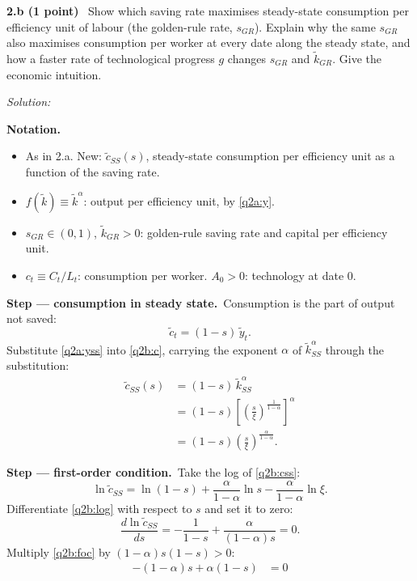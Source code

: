 \documentclass[11pt,a4paper]{article}
\newif\ifsolucoes
\newcommand{\sub}[2]{\Needspace{8\baselineskip}\par\medskip\noindent\textbf{#1 (#2)}~}
\newcommand{\resolespaco}[1][6cm]{\ifsolucoes\else\par\textit{Solution:}\vspace{#1}\par\fi}
\newcommand{\passo}[2]{\par\smallskip\noindent\textbf{Step --- #1.}~#2}
\newenvironment{notacao}{\par\smallskip\noindent\textbf{Notation.}\begin{itemize}[leftmargin=1.4em,topsep=1pt,itemsep=0pt]\small}{\end{itemize}}
\begin{document}
\sub{2.b}{1 point} Show which saving rate maximises steady-state consumption per efficiency unit
of labour (the golden-rule rate, $s_{GR}$). Explain why the same $s_{GR}$ also maximises consumption
per worker at every date along the steady state, and how a faster rate of technological progress
$g$ changes $s_{GR}$ and $\tilde k_{GR}$. Give the economic intuition.
\resolespaco[7cm]
\begin{sol}
\begin{notacao}
\item As in 2.a. New: $\tilde c_{SS}(s)$, steady-state consumption per efficiency unit as a function
of the saving rate.
\item $f(\tilde k)\equiv\tilde k^{\alpha}$: output per efficiency unit, by \eqref{q2a:y}.
\item $s_{GR}\in(0,1)$, $\tilde k_{GR}>0$: golden-rule saving rate and capital per efficiency unit.
\item $c_t\equiv C_t/L_t$: consumption per worker. $A_0>0$: technology at date 0.
\end{notacao}
\passo{consumption in steady state}{Consumption is the part of output not saved:}
\begin{equation}
\tilde c_t=(1-s)\,\tilde y_t. \label{q2b:c}
\end{equation}
Substitute \eqref{q2a:yss} into \eqref{q2b:c}, carrying the exponent $\alpha$ of
$\tilde k_{SS}^{\alpha}$ through the substitution:
\begin{align}
\tilde c_{SS}(s) &= (1-s)\,\tilde k_{SS}^{\alpha}\nonumber\\
&= (1-s)\left[\left(\frac{s}{\xi}\right)^{\frac{1}{1-\alpha}}\right]^{\alpha}\nonumber\\
&= (1-s)\left(\frac{s}{\xi}\right)^{\frac{\alpha}{1-\alpha}}. \label{q2b:css}
\end{align}
\passo{first-order condition}{Take the log of \eqref{q2b:css}:}
\begin{equation}
\ln\tilde c_{SS}=\ln(1-s)+\frac{\alpha}{1-\alpha}\ln s-\frac{\alpha}{1-\alpha}\ln\xi. \label{q2b:log}
\end{equation}
Differentiate \eqref{q2b:log} with respect to $s$ and set it to zero:
\begin{equation}
\frac{d\ln\tilde c_{SS}}{ds}=-\frac{1}{1-s}+\frac{\alpha}{(1-\alpha)s}=0. \label{q2b:foc}
\end{equation}
Multiply \eqref{q2b:foc} by $(1-\alpha)s(1-s)>0$:
\begin{align*}
-(1-\alpha)s+\alpha(1-s) &= 0\\

\end{align*}
\end{sol}
\end{document}
